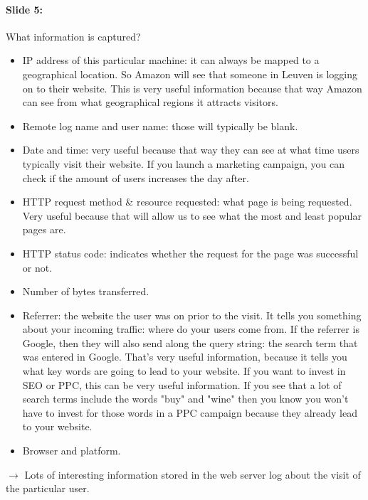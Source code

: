 \documentclass[10pt,a4paper]{report}
\begin{document}
\paragraph{Slide 5:}What information is captured? 
\begin{itemize}
\item IP address of this particular machine: it can always be mapped to a geographical location. So Amazon will see that someone in Leuven is logging on to their website. This is very useful information because that way Amazon can see from what geographical regions it attracts visitors.
\item Remote log name and user name: those will typically be blank.
\item Date and time: very useful because that way they can see at what time users typically visit their website. If you launch a marketing campaign, you can check if the amount of users increases the day after. 
\item HTTP request method \& resource requested: what page is being requested. Very useful because that will allow us to see what the most and least popular pages are. 
\item HTTP status code: indicates whether the request for the page was successful or not.
\item Number of bytes transferred.
\item Referrer: the website the user was on prior to the visit. It tells you something about your incoming traffic: where do your users come from. If the referrer is Google, then they will also send along the query string: the search term that was entered in Google. That's very useful information, because it tells you what key words are going to lead to your website. If you want to invest in SEO or PPC, this can be very useful information. If you see that a lot of search terms include the words "buy" and "wine" then you know you won't have to invest for those words in a PPC campaign because they already lead to your website.
\item Browser and platform.
\end{itemize}
$\rightarrow$ Lots of interesting information stored in the web server log about the visit of the particular user.
\end{document}
